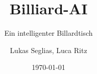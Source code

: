 \documentclass[
    10pt, %
    a4paper, %
    twoside, %
    openright, %
    numbers=noenddot, %
    BCOR=5mm, %
    parskip=half*, %
    thesis, %
]{bfhbook}
\author{Lukas Seglias, Luca Ritz}
\title{Billiard-AI}
\subtitle{Ein intelligenter Billardtisch}
\date{\today} %
\begin{document}
    \maketitle
    \frontmatter %
    \allowdisplaybreaks

    \tableofcontents
    \sloppy
    \mainmatter %
   
   
   
   
   
   
   

    \listoffigures
    \listoftables
    \printbibliography

    
    

    
\end{document}
